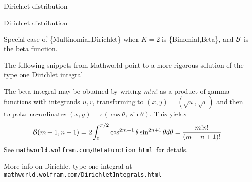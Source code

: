 \documentclass{beamer}
\begin{document}
\begin{frame}{Dirichlet distribution}
 \iteme  

\end{frame}

\begin{frame}{Dirichlet distribution}

\itemb
 \item Special case of \{Multinomial,Dirichlet\} when $K=2$ is \{Binomial,Beta\}, and ${\cal B}$ is the \alert{beta function}.
 \item The following snippets from Mathworld point to a more rigorous solution of the type one Dirichlet integral
  \itemb
  \item The beta integral may be obtained by writing $m!n!$ as a product of gamma functions with integrands $u,v$, transforming to $(x,y)=(\sqrt{u},\sqrt{v})$ and then to polar co-ordinates $(x,y)=r(\cos\theta,\sin\theta)$. This yields
\[
{\cal B}(m+1,n+1) = 2\int_0^{\pi/2} \cos^{2m+1} \theta \sin^{2n+1} \theta d\theta
= \frac{m!n!}{(m+n+1)!}
\]
See {\tt mathworld.wolfram.com/BetaFunction.html}\ for details.
  \item More info on Dirichlet type one integral at {\tt mathworld.wolfram.com/DirichletIntegrals.html}
  \iteme
\iteme

\end{frame}
\end{document}
